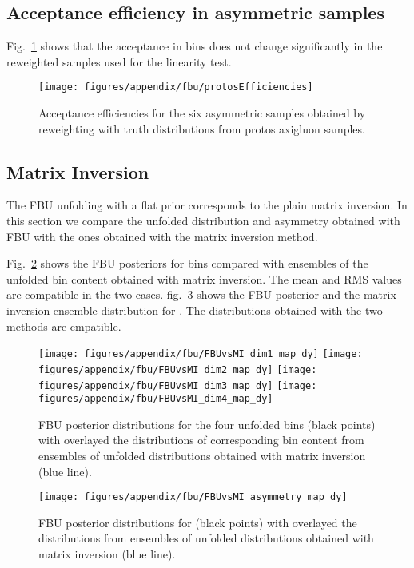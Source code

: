 \subsection{Acceptance efficiency in asymmetric samples}
Fig.~\ref{fig:app:protosEff} shows that the acceptance in \dy{} bins does not change significantly in the reweighted \alpgen{} samples used for the linearity test.

\begin{figure}
  \begin{center}
  \texttt{[image: figures/appendix/fbu/protosEfficiencies]}
  \caption{
    \label{fig:app:protosEff}
    Acceptance efficiencies for the six asymmetric \alpgen{} samples obtained by reweighting with truth \dy{} distributions from protos axigluon samples.
  }
  \end{center}
\end{figure}
\clearpage

\subsection{Matrix Inversion}
\label{sec:app:unfolding:matinv}
The FBU unfolding with a flat prior corresponds to the plain matrix inversion.
In this section we compare the unfolded \dy{} distribution and asymmetry obtained
with FBU with the ones obtained with the matrix inversion method.

Fig.~\ref{fig:app:fbuvsmatinvbins} shows the FBU posteriors for \dy{} bins compared 
with ensembles of the unfolded bin content obtained with matrix inversion.
The mean and RMS values are compatible in the two cases.
fig.~\ref{fig:app:fbuvsmatinvasymm} shows the FBU posterior and the matrix inversion 
ensemble distribution for \ac{}. The distributions obtained with the two methods are cmpatible. 
\begin{figure}
  \begin{center}
    \texttt{[image: figures/appendix/fbu/FBUvsMI\_dim1\_map\_dy]}
    \texttt{[image: figures/appendix/fbu/FBUvsMI\_dim2\_map\_dy]}
    \texttt{[image: figures/appendix/fbu/FBUvsMI\_dim3\_map\_dy]}
    \texttt{[image: figures/appendix/fbu/FBUvsMI\_dim4\_map\_dy]}
    \caption{
      \label{fig:app:fbuvsmatinvbins}
      FBU posterior distributions for the four unfolded \dy{} bins (black points) 
      with overlayed the distributions of corresponding bin content from ensembles
      of unfolded \dy{} distributions obtained with matrix inversion (blue line).
    }
  \end{center}
\end{figure}

\begin{figure}
  \begin{center}
    \texttt{[image: figures/appendix/fbu/FBUvsMI\_asymmetry\_map\_dy]}
    \caption{
      \label{fig:app:fbuvsmatinvasymm}
      FBU posterior distributions for \ac{} (black points) 
      with overlayed the \ac{} distributions from ensembles
      of unfolded \dy{} distributions obtained with matrix inversion (blue line).
    }
  \end{center}
\end{figure}

